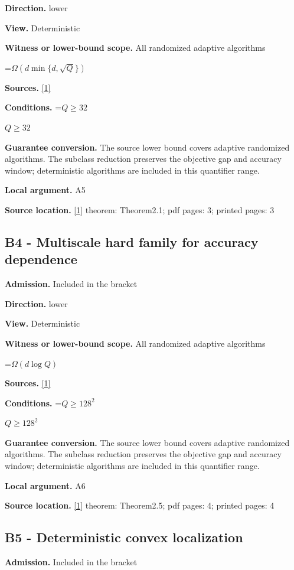 \documentclass[10pt,a4paper]{article}
\newcommand{\AtlasMath}[1]{\par\begingroup\centering\setbox0=\hbox{$\displaystyle #1$}\ifdim\wd0>1.4\linewidth\typeout{ATLAS WIDE FORMULA: \the\wd0}\fi\ifdim\wd0>\linewidth\resizebox{\linewidth}{!}{\box0}\else\box0\fi\par\endgroup}
\newcommand{\AtlasInlineMath}[1]{\begingroup\setbox0=\hbox{$#1$}\ifdim\wd0>.4\linewidth\endgroup\AtlasMath{#1}\else\endgroup$#1$\fi}
\begin{document}
\textbf{Direction.} lower

\textbf{View.} Deterministic

\textbf{Witness or lower-bound scope.} All randomized adaptive algorithms

\AtlasMath{\Omega(d\min\{d,\sqrt Q\})}
\textbf{Sources.} \href{https://arxiv.org/html/2610.00345v1}{[1]}

\textbf{Conditions.} \AtlasInlineMath{Q\ge32}

\textbf{Guarantee conversion.} The source lower bound covers adaptive randomized algorithms. The subclass reduction preserves the objective gap and accuracy window; deterministic algorithms are included in this quantifier range.

\textbf{Local argument.} A5

\textbf{Source location.} \href{https://arxiv.org/html/2610.00345v1}{[1]} theorem: Theorem2.1; pdf pages: 3; printed pages: 3

\subsection{B4 - Multiscale hard family for accuracy dependence}
\textbf{Admission.} Included in the bracket

\textbf{Direction.} lower

\textbf{View.} Deterministic

\textbf{Witness or lower-bound scope.} All randomized adaptive algorithms

\AtlasMath{\Omega(d\log Q)}
\textbf{Sources.} \href{https://arxiv.org/html/2610.00345v1}{[1]}

\textbf{Conditions.} \AtlasInlineMath{Q\ge128^2}

\textbf{Guarantee conversion.} The source lower bound covers adaptive randomized algorithms. The subclass reduction preserves the objective gap and accuracy window; deterministic algorithms are included in this quantifier range.

\textbf{Local argument.} A6

\textbf{Source location.} \href{https://arxiv.org/html/2610.00345v1}{[1]} theorem: Theorem2.5; pdf pages: 4; printed pages: 4

\subsection{B5 - Deterministic convex localization}
\textbf{Admission.} Included in the bracket
\end{document}
